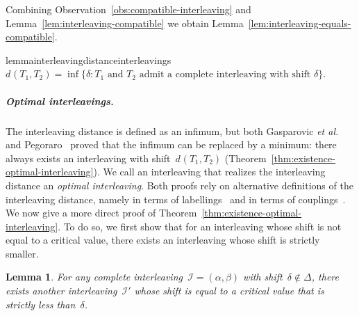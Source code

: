 \documentclass[11pt]{article}
\newtheorem{lemma}[theorem]{Lemma}
\newcommand{\etal}{\emph{et al.}}
\newcommand{\intdist}[1]{d^{{#1}}}
\newcommand{\I}{\mathcal{I}}
\renewcommand{\mid}{:}
\begin{document}
%
\noindent
Combining Observation~\ref{obs:compatible-interleaving} and Lemma~\ref{lem:interleaving-compatible} we obtain Lemma~\ref{lem:interleaving-equals-compatible}.
%
\begin{restatable}{lemma}{interleavingdistanceinterleavings}
\label{lem:interleaving-equals-compatible}
	$\intdist{}(T_1, T_2) = \inf\{\delta \mid T_1 \text{ and } T_2 \text{ admit a complete interleaving with shift } \delta \}$.
\end{restatable}
%
\subparagraph{Optimal interleavings.}
The interleaving distance is defined as an infimum, but both Gasparovic \etal~\cite{gasparovic2019intrinsic} and Pegoraro~\cite{pegoraro2025graph-matching} proved that the infimum can be replaced by a minimum: there always exists an interleaving with shift~$\intdist{}(T_1, T_2)$ (Theorem~\ref{thm:existence-optimal-interleaving}).
We call an interleaving that realizes the interleaving distance an \emph{optimal interleaving}.
Both proofs rely on alternative definitions of the interleaving distance, namely in terms of labellings~\cite{gasparovic2019intrinsic} and in terms of couplings~\cite{pegoraro2025graph-matching}.
We now give a more direct proof of Theorem~\ref{thm:existence-optimal-interleaving}.
To do so, we first show that for an interleaving whose shift is not equal to a critical value, there exists an interleaving whose shift is strictly smaller.
%
\newpage
\begin{lemma}\label{lem:existence-optimal-interleaving}
	For any complete interleaving~$\I = (\alpha, \beta)$ with shift~$\delta \notin \Delta$, there exists another interleaving~$\I'$ whose shift is equal to a critical value that is strictly less than~$\delta$.
\end{lemma}
\end{document}
